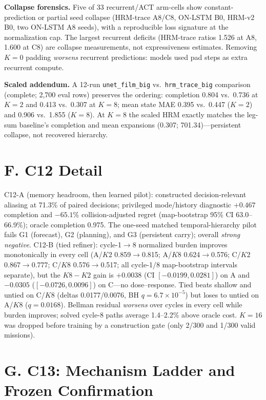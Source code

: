 \documentclass[letterpaper]{article} %
\newcommand{\stage}[1]{\textsc{#1}}
\begin{document}
\textbf{Collapse forensics.} Five of 33 recurrent/ACT arm-cells show constant-prediction or partial seed collapse (HRM-trace A8/C8, ON-LSTM B0, HRM-v2 B0, two ON-LSTM A8 seeds), with a reproducible loss signature at the normalization cap. The largest recurrent deficits (HRM-trace ratios 1.526 at A8, 1.600 at C8) are collapse measurements, not expressiveness estimates. Removing $K{=}0$ padding \emph{worsens} recurrent predictions: models used pad steps as extra recurrent compute.

\textbf{Scaled addendum.} A 12-run \texttt{unet\_film\_big} vs.\ \texttt{hrm\_trace\_big} comparison (complete; 2{,}700 eval rows) preserves the ordering: completion 0.804 vs.\ 0.736 at $K{=}2$ and 0.413 vs.\ 0.307 at $K{=}8$; mean state MAE 0.395 vs.\ 0.447 ($K{=}2$) and 0.906 vs.\ 1.855 ($K{=}8$). At $K{=}8$ the scaled HRM exactly matches the leg-sum baseline's completion and mean expansions (0.307; 701.34)---persistent collapse, not recovered hierarchy.

\section{F. \stage{C12} Detail}

\stage{C12-A} (memory headroom, then learned pilot): constructed decision-relevant aliasing at 71.3\% of paired decisions; privileged mode/history diagnostic $+0.467$ completion and $-65.1$\% collision-adjusted regret (map-bootstrap 95\% CI 63.0--66.9\%); oracle completion 0.975. The one-seed matched temporal-hierarchy pilot fails G1 (forecast), G2 (planning), and G3 (persistent carry); overall \emph{strong negative}. \stage{C12-B} (tied refiner): cycle-1$\to$8 normalized burden improves monotonically in every cell (A/$K2$ 0.859$\to$0.815; A/$K8$ 0.624$\to$0.576; C/$K2$ 0.867$\to$0.777; C/$K8$ 0.576$\to$0.517; all cycle-1/8 map-bootstrap intervals separate), but the $K8{-}K2$ gain is $+0.0038$ (CI $[-0.0199, 0.0281]$) on A and $-0.0305$ ($[-0.0726, 0.0096]$) on C---no dose--response. Tied beats shallow and untied on C/$K8$ (deltas 0.0177/0.0076, BH $q{=}6.7{\times}10^{-5}$) but loses to untied on A/$K8$ ($q{=}0.0168$). Bellman residual \emph{worsens} over cycles in every cell while burden improves; solved cycle-8 paths average 1.4--2.2\% above oracle cost. $K{=}16$ was dropped before training by a construction gate (only 2/300 and 1/300 valid missions).

\section{G. C13: Mechanism Ladder and Frozen Confirmation}
\end{document}
